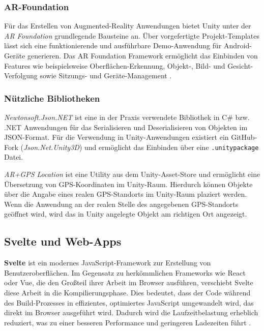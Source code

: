 \subsubsection{AR-Foundation}

Für das Erstellen von Augmented-Reality Anwendungen bietet Unity unter der \textit{AR Foundation} grundlegende Bausteine an. Über vorgefertigte Projekt-Templates lässt sich eine funktionierende und ausführbare Demo-Anwendung für Android-Geräte generieren. Das AR Foundation Framework ermöglicht das Einbinden von Features wie beispielsweise Oberflächen-Erkennung, Objekt-, Bild- und Gesicht-Verfolgung sowie Sitzungs- und Geräte-Management \autocite{Unity2024}.

\subsubsection{Nützliche Bibliotheken}

\textit{Newtonsoft.Json.NET} ist eine in der Praxis verwendete Bibliothek in C\# bzw. .NET Anwendungen für das Serialisieren und Deserialisieren von Objekten im JSON-Format. Für die Verwendung in Unity-Anwendungen existiert ein GitHub-Fork (\textit{Json.Net.Unity3D}) und ermöglicht das Einbinden über eine \lstinline{.unitypackage} Datei. \autocite{SaladLab2024}

\textit{AR+GPS Location} ist eine Utility aus dem Unity-Asset-Store und ermöglicht eine Übersetzung von GPS-Koordinaten im Unity-Raum. Hierdurch können Objekte über die Angabe eines realen GPS-Standorts im Unity-Raum plaziert werden. Wenn die Anwendung an der realen Stelle des angegebenen GPS-Standorts geöffnet wird, wird das in Unity angelegte Objekt am richtigen Ort angezeigt. \autocite{ArGpsLocation}

\subsection{Svelte und Web-Apps}

\textbf{Svelte} ist ein modernes JavaScript-Framework zur Erstellung von Benutzeroberflächen. Im Gegensatz zu herkömmlichen Frameworks wie React oder Vue, die den Großteil ihrer Arbeit im Browser ausführen, verschiebt Svelte diese Arbeit in die Kompilierungsphase. Dies bedeutet, dass der Code während des Build-Prozesses in effizientes, optimiertes JavaScript umgewandelt wird, das direkt im Browser ausgeführt wird. Dadurch wird die Laufzeitbelastung erheblich reduziert, was zu einer besseren Performance und geringeren Ladezeiten führt \autocite{Svelte2024}.

